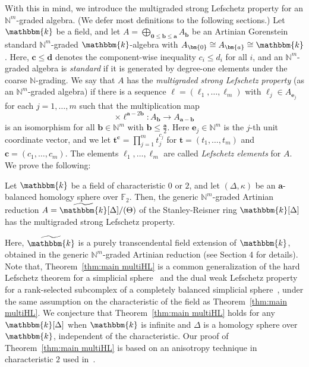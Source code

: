 With this in mind, we introduce the multigraded strong Lefschetz property for an $\mathbb{N}^m$-graded algebra. (We defer most definitions to the following sections.)
Let $\mathbbm{k}$ be a field, and let $A=\bigoplus_{\bm{0} \leq \bm{b} \leq \bm{a}} A_{\bm{b}}$ be an Artinian Gorenstein standard $\mathbb{N}^m$-graded $\mathbbm{k}$-algebra with $A_{\bm{0}}\cong A_{\bm{a}} \cong \mathbbm{k}$.
Here, $\bm{c} \leq \bm{d}$ denotes the component-wise inequality $c_i \leq d_i$ for all $i$, and an $\mathbb{N}^m$-graded algebra is \emph{standard} if it is generated by degree-one elements under the coarse $\mathbb{N}$-grading.
We say that $A$ has the \emph{multigraded strong Lefschetz property} (as an $\mathbb{N}^m$-graded algebra) if there is a sequence $\bm{\ell}=(\ell_1,\ldots,\ell_m)$ with $\ell_j \in A_{\bm{e}_j}$ for each $j=1,\ldots,m$ such that the multiplication map
\[
\times\bm{\ell}^{\bm{a}-2\bm{b}} : A_{\bm{b}} \rightarrow A_{\bm{a}-\bm{b}}
\]
is an isomorphism for all $\bm{b} \in \mathbb{N}^m$ with $\bm{b} \leq \frac{\bm{a}}{2}$. Here $\bm{e}_j \in \mathbb{N}^m$ is the $j$-th unit coordinate vector, and we let $\bm{t}^{\bm{c}}=\prod_{j=1}^m t_j^{c_j}$ for $\bm{t}=(t_1,\ldots,t_m)$ and $\bm{c}=(c_1,\ldots,c_m)$. The elements $\ell_1,\ldots,\ell_m$ are called \emph{Lefschetz elements} for $A$.
We prove the following:
\begin{theorem} \label{thm:main multiHL}
Let $\mathbbm{k}$ be a field of characteristic $0$ or $2$, and let $(\Delta,\kappa)$ be an $\bm{a}$-balanced homology sphere over $\mathbb{F}_2$. 
Then, the generic $\mathbb{N}^m$-graded Artinian reduction $A=\widetilde{\mathbbm{k}}[\Delta]/(\Theta)$ of the Stanley-Reisner ring $\mathbbm{k}[\Delta]$ has the multigraded strong Lefschetz property.
\end{theorem}
Here, $\widetilde{\mathbbm{k}}$ is a purely transcendental field extension of $\mathbbm{k}$, obtained in the generic $\mathbb{N}^m$-graded Artinian reduction (see Section 4 for details). 
Note that, Theorem~\ref{thm:main multiHL} is a common generalization of the hard Lefschetz theorem for a simplicial sphere~\cite{Adi,KX,PP} and the dual weak Lefschetz property for a rank-selected subcomplex of a completely balanced simplicial sphere~\cite[Theorem 3.3]{JM}, under the same assumption on the characteristic of the field as Theorem~\ref{thm:main multiHL}.
We conjecture that Theorem~\ref{thm:main multiHL} holds for any $\mathbbm{k}[\Delta]$ when $\mathbbm{k}$ is infinite and $\Delta$ is a homology sphere over $\mathbbm{k}$, independent of the characteristic.
Our proof of Theorem~\ref{thm:main multiHL} is based on an anisotropy technique in characteristic $2$ used in~\cite{APP,APPS,KX,PP}.
